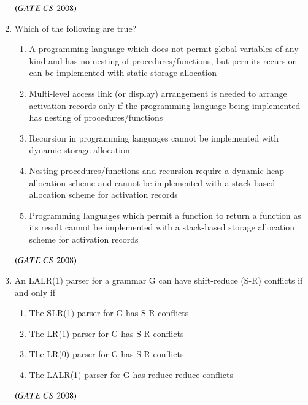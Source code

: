 \documentclass[journal]{IEEEtran}
\numberwithin{equation}{enumi}
\numberwithin{figure}{enumi}
\begin{document}
\begin{enumerate}
 \begin{enumerate}
\end{enumerate}
\hfill $\left(GATE\ CS\  2008\right)$
 
\item Which of the following are true?
\begin{enumerate}  
   \item A programming language which does not permit global variables of any kind and has no nesting of procedures/functions, but permits recursion can be implemented with static storage allocation
  \item Multi-level access link (or display) arrangement is needed to arrange activation records only if the programming language being implemented has nesting of procedures/functions
  \item Recursion in programming languages cannot be implemented with dynamic storage allocation
  \item Nesting procedures/functions and recursion require a dynamic heap allocation scheme and cannot be implemented with a stack-based allocation
scheme for activation records
  \item Programming languages which permit a function to return a function as its result cannot be implemented with a stack-based storage allocation scheme for activation records
\end{enumerate}

\begin{enumerate} 
\end{enumerate}
\hfill $\left(GATE\ CS\  2008\right)$

\item An LALR(1) parser for a grammar G can have shift-reduce (S-R) conflicts if and only if 
\begin{enumerate}
    \item  The SLR(1) parser for G has S-R conflicts
    \item The LR(1) parser for G has S-R conflicts
    \item The LR(0) parser for G has S-R conflicts
    \item The LALR(1) parser for G has reduce-reduce conflicts
\end{enumerate}
\hfill $\left(GATE\ CS\  2008\right)$
 


\end{enumerate}
\end{document}
